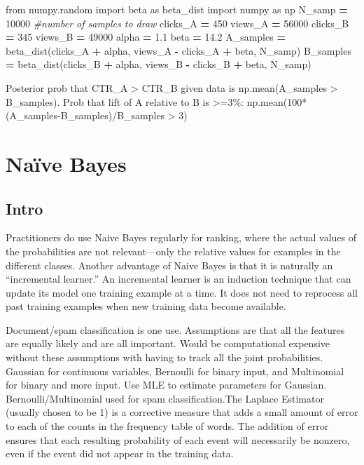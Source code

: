 \documentclass[]{book}
\newenvironment{Shaded}{\begin{snugshade}}{\end{snugshade}}
\newcommand{\DecValTok}[1]{\textcolor[rgb]{0.00,0.00,0.81}{#1}}
\newcommand{\FloatTok}[1]{\textcolor[rgb]{0.00,0.00,0.81}{#1}}
\newcommand{\ImportTok}[1]{#1}
\newcommand{\CommentTok}[1]{\textcolor[rgb]{0.56,0.35,0.01}{\textit{#1}}}
\newcommand{\OperatorTok}[1]{\textcolor[rgb]{0.81,0.36,0.00}{\textbf{#1}}}
\newcommand{\NormalTok}[1]{#1}
\theoremstyle{definition}
\theoremstyle{definition}
\theoremstyle{definition}
\theoremstyle{remark}
\begin{document}
\begin{Shaded}
\begin{Highlighting}[]
\ImportTok{from}\NormalTok{ numpy.random }\ImportTok{import}\NormalTok{ beta }\ImportTok{as}\NormalTok{ beta_dist}
\ImportTok{import}\NormalTok{ numpy }\ImportTok{as}\NormalTok{ np}
\NormalTok{N_samp }\OperatorTok{=} \DecValTok{10000} \CommentTok{#number of samples to draw}
\NormalTok{clicks_A }\OperatorTok{=} \DecValTok{450}
\NormalTok{views_A }\OperatorTok{=} \DecValTok{56000}
\NormalTok{clicks_B }\OperatorTok{=} \DecValTok{345}
\NormalTok{views_B }\OperatorTok{=} \DecValTok{49000}
\NormalTok{alpha }\OperatorTok{=} \FloatTok{1.1}
\NormalTok{beta }\OperatorTok{=} \FloatTok{14.2}
\NormalTok{A_samples }\OperatorTok{=}\NormalTok{ beta_dist(clicks_A }\OperatorTok{+}\NormalTok{ alpha, views_A }\OperatorTok{-}\NormalTok{ clicks_A }\OperatorTok{+}\NormalTok{ beta, N_samp)}
\NormalTok{B_samples }\OperatorTok{=}\NormalTok{ beta_dist(clicks_B }\OperatorTok{+}\NormalTok{ alpha, views_B }\OperatorTok{-}\NormalTok{ clicks_B }\OperatorTok{+}\NormalTok{ beta, N_samp)}
\end{Highlighting}
\end{Shaded}

Posterior prob that CTR\_A \textgreater{} CTR\_B given data is
np.mean(A\_samples \textgreater{} B\_samples). Prob that lift of A
relative to B is \textgreater{}=3\%:
np.mean(100*(A\_samples-B\_samples)/B\_samples \textgreater{} 3)

\section{Naïve Bayes}\label{naive-bayes}

\subsection{Intro}\label{intro-16}

Practitioners do use Naive Bayes regularly for ranking, where the actual
values of the probabilities are not relevant---only the relative values
for examples in the different classes. Another advantage of Naive Bayes
is that it is naturally an ``incremental learner.'' An incremental
learner is an induction technique that can update its model one training
example at a time. It does not need to reprocess all past training
examples when new training data become available.

Document/spam classification is one use. Assumptions are that all the
features are equally likely and are all important. Would be
computational expensive without these assumptions with having to track
all the joint probabilities. Gaussian for continuous variables,
Bernoulli for binary input, and Multinomial for binary and more input.
Use MLE to estimate parameters for Gaussian. Bernoulli/Multinomial used
for spam classification.The Laplace Estimator (usually chosen to be 1)
is a corrective measure that adds a small amount of error to each of the
counts in the frequency table of words. The addition of error ensures
that each resulting probability of each event will necessarily be
nonzero, even if the event did not appear in the training data.
\end{document}
